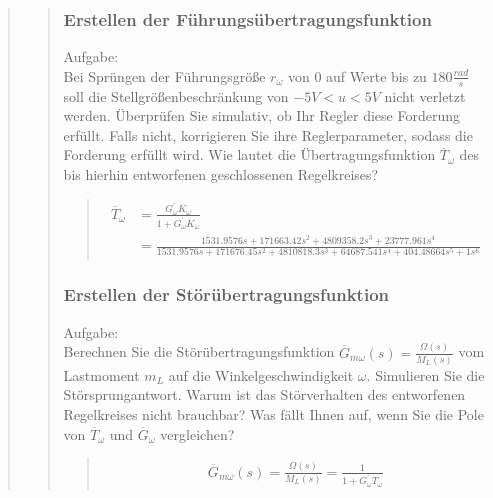 \begin{quote}
\begin{quote}
        \subsubsection{Erstellen der Führungsübertragungsfunktion}
        Aufgabe:\\
        Bei Sprüngen der Führungsgröße $r_\omega$ von $0$ auf Werte bis zu $180 \frac{rad}{s}$ soll die
        Stellgrößenbeschränkung von $−5V < u < 5V$ nicht verletzt werden. Überprüfen Sie simulativ, ob Ihr Regler
        diese Forderung erfüllt. Falls nicht, korrigieren Sie ihre Reglerparameter, sodass die Forderung erfüllt wird.
        Wie lautet die Übertragungsfunktion $\overline{T}_\omega$ des bis hierhin entworfenen geschlossenen
        Regelkreises?
        \begin{quote}
            \begin{equation*}
            	\begin{split}
            		\overline{T}_\omega &= \frac{G_\omega^{'} K_\omega}{1 + G_\omega^{'} K_\omega}\\
            		&= \frac{1531.9576s +  171663.42s^2 +  4809358.2s^3 +  23777.961s^4}{1531.9576s +  171676.45s^2 + 
            		4810818.3s^3 +  64687.541s^4 +  404.48664s^5 +  1s^6}
            	\end{split}
            \end{equation*}
        \end{quote}
        
        \subsubsection{Erstellen der Störübertragungsfunktion}
        Aufgabe:\\
        Berechnen Sie die Störübertragungsfunktion $\overline{G}_{m\omega} (s) = \frac{\Omega(s)}{M_L (s)}$ vom
        Lastmoment $m_L$ auf die Winkelgeschwindigkeit $\omega$. Simulieren Sie die Störsprungantwort. Warum ist das
        Störverhalten des entworfenen Regelkreises nicht brauchbar? Was fällt Ihnen auf, wenn Sie die Pole von
        $\overline{T}_\omega$ und $\overline{G}_\omega$ vergleichen?
		\begin{quote}
			\begin{equation*}
            	\begin{split}
            		\overline{G}_{m\omega} (s) = \frac{\Omega(s)}{M_L (s)} = \frac{1}{1+ G_\omega^{'} T_\omega}
            	\end{split}
            \end{equation*}
		\end{quote}
		

\end{quote}
\end{quote}
